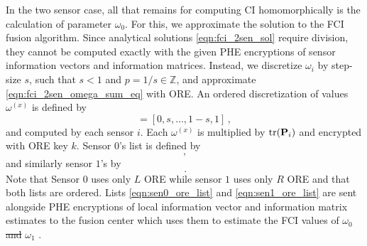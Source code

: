 \documentclass[letterpaper, 10 pt, conference]{ieeeconf}  %
\providecommand{\DIFadd}[1]{{\protect\color{blue}\uwave{#1}}} %
\providecommand{\DIFdel}[1]{{\protect\color{red}\sout{#1}}}                      %
\providecommand{\DIFaddbegin}{} %
\providecommand{\DIFaddend}{} %
\providecommand{\DIFdelbegin}{} %
\providecommand{\DIFdelend}{} %
\begin{document}
In the two sensor case, all that remains for computing CI homomorphically is the calculation of parameter \DIFdelbegin \DIFdel{$\omega_0$}\DIFdelend \DIFaddbegin \DIFadd{$\omega_1$}\DIFaddend . For this, we approximate the solution to the FCI fusion algorithm. Since analytical solutions \eqref{eqn:fci_2sen_sol} require division, they cannot be computed exactly with the given PHE encryptions of sensor information vectors and information matrices. Instead, we discretize $\omega_i$ by step-size $s$, such that $s<1$ and $p=1/s \in \mathbb{Z}$, and approximate \eqref{eqn:fci_2sen_omega_sum_eq} with ORE. An ordered discretization of values $\omega^{(x)}$ is defined by
\begin{equation}
   [\omega\DIFdelbegin \DIFdel{^{(0)}}\DIFdelend \DIFaddbegin \DIFadd{^{(1)}}\DIFaddend ,\dots,\omega^{(p)}] = [0,s,\dots,1-s,1]\,,
\end{equation}
and computed by each sensor $i$. Each $\omega^{(x)}$ is multiplied by $\operatorname{tr}({{\mathbf{P}}}_i)$ and encrypted with ORE key $k$. Sensor \DIFdelbegin \DIFdel{$0$}\DIFdelend \DIFaddbegin \DIFadd{$1$}\DIFaddend 's list is defined by 
\begin{equation}
   [\mathcal{E}^L_{ORE}(\omega\DIFdelbegin \DIFdel{^{(0)}}\DIFdelend \DIFaddbegin \DIFadd{^{(1)}}\DIFaddend \tr(\mP\DIFdelbegin \DIFdel{_0}\DIFdelend \DIFaddbegin \DIFadd{_1}\DIFaddend )),\dots,\mathcal{E}^L_{ORE}(\omega^{(p)}\tr(\mP\DIFdelbegin \DIFdel{_0}\DIFdelend \DIFaddbegin \DIFadd{_1}\DIFaddend ))]\,, \label{eqn:sen0_ore_list}
\end{equation}
and similarly sensor \DIFdelbegin \DIFdel{$1$}\DIFdelend \DIFaddbegin \DIFadd{$2$}\DIFaddend 's by
\begin{equation}
   [\mathcal{E}^R_{ORE}(\omega\DIFdelbegin \DIFdel{^{(0)}}\DIFdelend \DIFaddbegin \DIFadd{^{(1)}}\DIFaddend \tr(\mP\DIFdelbegin \DIFdel{_1}\DIFdelend \DIFaddbegin \DIFadd{_2}\DIFaddend )),\dots,\mathcal{E}^R_{ORE}(\omega^{(p)}\tr(\mP\DIFdelbegin \DIFdel{_1}\DIFdelend \DIFaddbegin \DIFadd{_2}\DIFaddend ))]\,. \label{eqn:sen1_ore_list}
\end{equation}
Note that Sensor \DIFdelbegin \DIFdel{$0$ }\DIFdelend \DIFaddbegin \DIFadd{$1$ }\DIFaddend uses only $L$ ORE while sensor \DIFdelbegin \DIFdel{$1$ }\DIFdelend \DIFaddbegin \DIFadd{$2$ }\DIFaddend uses only $R$ ORE and that both lists are ordered. Lists \eqref{eqn:sen0_ore_list} and \eqref{eqn:sen1_ore_list} are sent alongside PHE encryptions of local information vector and information matrix estimates to the fusion center which uses them to estimate the FCI values of \DIFdelbegin \DIFdel{$\omega_0$ and }\DIFdelend $\omega_1$ \DIFaddbegin \DIFadd{and $\omega_2$}\DIFaddend .
\end{document}

